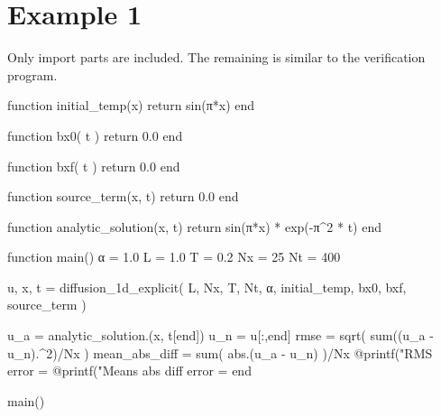 \documentclass[a4paper,11pt]{article}
\begin{document}
\section{Example 1}

Only import parts are included. The remaining is similar to the verification program.

\begin{juliacode}
function initial_temp(x)
    return sin(π*x)
end

function bx0( t )
    return 0.0
end

function bxf( t )
    return 0.0
end

function source_term(x, t)
    return 0.0
end

function analytic_solution(x, t)
    return sin(π*x) * exp(-π^2 * t)
end

function main()
    α = 1.0
    L = 1.0
    T = 0.2
    Nx = 25
    Nt = 400

    u, x, t = diffusion_1d_explicit( L, Nx, T, Nt, α, initial_temp, bx0, bxf, source_term )

    u_a = analytic_solution.(x, t[end])
    u_n = u[:,end]
    rmse = sqrt( sum((u_a - u_n).^2)/Nx )
    mean_abs_diff = sum( abs.(u_a - u_n) )/Nx
    @printf("RMS error            = %
    @printf("Means abs diff error = %
end

main()
\end{juliacode}









\end{document}
